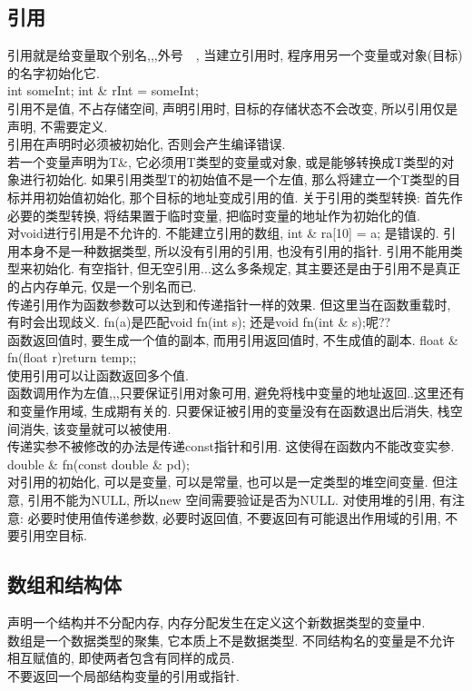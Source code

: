 \documentclass[a4paper,10pt,english]{article}
\begin{document}
\subsection {引用}
引用就是给变量取个别名,,,外号~~, 当建立引用时, 程序用另一个变量或对象(目标)的名字初始化它. \\
int someInt; int \& rInt = someInt; \\
引用不是值, 不占存储空间, 声明引用时, 目标的存储状态不会改变, 所以引用仅是声明, 不需要定义. \\
引用在声明时必须被初始化, 否则会产生编译错误. \\
若一个变量声明为T\&, 它必须用T类型的变量或对象, 或是能够转换成T类型的对象进行初始化. 如果引用类型T的初始值不是一个左值, 那么将建立一个T类型的目标并用初始值初始化, 那个目标的地址变成引用的值. 关于引用的类型转换: 首先作必要的类型转换, 将结果置于临时变量, 把临时变量的地址作为初始化的值. \\
对void进行引用是不允许的. 不能建立引用的数组, int \& ra[10] = a; 是错误的. 引用本身不是一种数据类型, 所以没有引用的引用, 也没有引用的指针. 引用不能用类型来初始化. 有空指针, 但无空引用...这么多条规定, 其主要还是由于引用不是真正的占内存单元, 仅是一个别名而已.\\
传递引用作为函数参数可以达到和传递指针一样的效果. 但这里当在函数重载时, 有时会出现歧义. fn(a)是匹配void fn(int s); 还是void fn(int \& s);呢??\\
函数返回值时, 要生成一个值的副本, 而用引用返回值时, 不生成值的副本. float \& fn(float r){return temp;}; \\
使用引用可以让函数返回多个值. \\
函数调用作为左值,,,只要保证引用对象可用, 避免将栈中变量的地址返回..这里还有和变量作用域, 生成期有关的. 只要保证被引用的变量没有在函数退出后消失, 栈空间消失, 该变量就可以被使用. \\
传递实参不被修改的办法是传递const指针和引用. 这使得在函数内不能改变实参. double \& fn(const double \& pd);  \\
对引用的初始化, 可以是变量, 可以是常量, 也可以是一定类型的堆空间变量. 但注意, 引用不能为NULL, 所以new 空间需要验证是否为NULL. 对使用堆的引用, 有注意: 必要时使用值传递参数, 必要时返回值, 不要返回有可能退出作用域的引用, 不要引用空目标. \\

\subsection{数组和结构体}
声明一个结构并不分配内存, 内存分配发生在定义这个新数据类型的变量中. \\
数组是一个数据类型的聚集, 它本质上不是数据类型. 不同结构名的变量是不允许相互赋值的, 即使两者包含有同样的成员. \\
不要返回一个局部结构变量的引用或指针.
\end{document}

